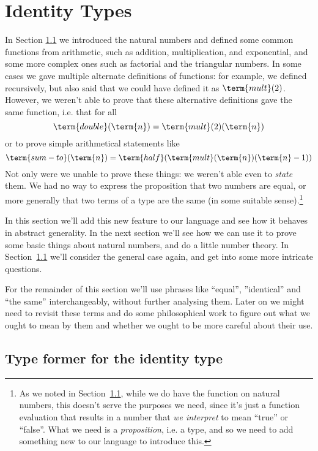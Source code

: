 \section{Identity Types}

In Section \ref{} we introduced the natural numbers and defined some common functions from arithmetic, such as addition, multiplication, and exponential, and some more complex ones such as factorial and the triangular numbers.  In some cases we gave multiple alternate definitions of functions: for example, we defined  recursively, but also said that we could have defined it as $\term{mult}(2)$.  However, we weren't able to prove that these alternative definitions gave the same function, i.e. that for all 
\[
\term{double}(\term{n}) = \term{mult}(2)(\term{n})
\]
or to prove simple arithmetical statements like
\[
\term{sum-to}(\term{n}) = \term{half}(\term{mult}(\term{n})(\term{n}-1))
\]
Not only were we unable to prove these things: we weren't able even to \emph{state} them.  We had no way to express the proposition 
that two numbers are equal,
or more generally that two terms of a type are the same (in some suitable sense).\footnote{
As we noted in Section~\ref{}, while we do have the  function on natural numbers, this doesn't serve the purposes we need, since it's just a function evaluation that results in a number that \emph{we interpret} to mean ``true'' or ``false''.  What we need is a \emph{proposition}, i.e. a type, and so we need to add something new to our language to introduce this.
}

In this section we'll add this new feature to our language and see how it behaves in abstract generality.  In the next section we'll see how we can use it to prove some basic things about natural numbers, and do a little number theory.  In Section~\ref{} we'll consider the general case again, and get into some more intricate questions.

For the remainder of this section we'll use phrases like ``equal'', ''identical'' and ``the same'' interchangeably, without further analysing them.  Later on we might need to revisit these terms and do some philosophical work to figure out what we ought to mean by them and whether we ought to be more careful about their use.

\newpage
\subsection{Type former for the identity type}

